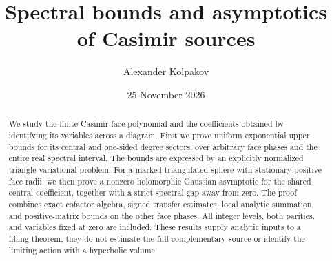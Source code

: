 \documentclass[11pt]{article}
\title{Spectral bounds and asymptotics of Casimir sources}
\author{Alexander Kolpakov}\date{25 November 2026}
\numberwithin{equation}{section}
\theoremstyle{remark}\newtheorem{remark}[theorem]{Remark}
\begin{document}
\maketitle
\begin{abstract}
We study the finite Casimir face polynomial and the coefficients obtained
by identifying its variables across a diagram. First we prove uniform
exponential upper bounds for its central and one-sided degree sectors,
over arbitrary face phases and the entire real spectral interval.
The bounds are expressed by an explicitly normalized triangle
variational problem. For a marked triangulated sphere with stationary
positive face radii, we then prove a nonzero holomorphic Gaussian
asymptotic for the shared central coefficient, together with a strict
spectral gap away from zero. The proof combines exact cofactor algebra,
signed transfer estimates, local analytic summation, and positive-matrix
bounds on the other face phases. All integer levels, both parities,
and variables fixed at zero are included. These results supply analytic
inputs to a filling theorem; they do not estimate the full complementary
source or identify the limiting action with a hyperbolic volume.
\end{abstract}
















\end{document}
